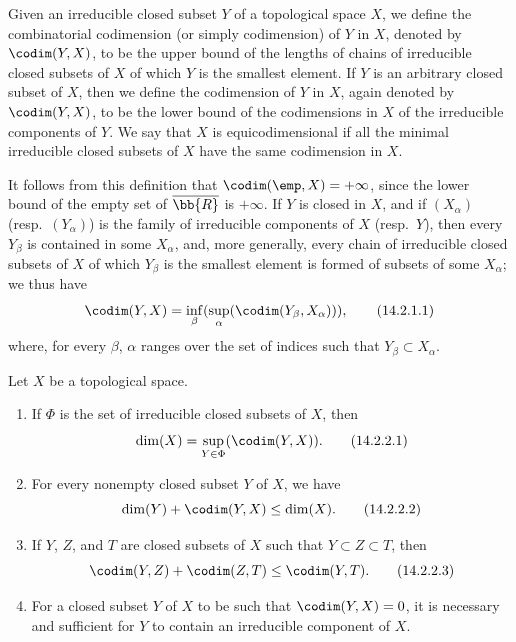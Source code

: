 \begin{definition}[14.2.1]
\label{0.14.2.1}
Given an irreducible closed subset $Y$ of a topological space $X$, we define the combinatorial codimension (or simply codimension) of $Y$ in $X$, denoted by $\codim(Y,X)$, to be the upper bound of the lengths of chains of irreducible closed subsets of $X$ of which $Y$ is the smallest element.
If $Y$ is an arbitrary closed subset of $X$, then we define the codimension of $Y$ in $X$, again denoted by $\codim(Y,X)$, to be the lower bound of the codimensions in $X$ of the irreducible components of $Y$.
We say that $X$ is equicodimensional if all the minimal irreducible closed subsets of $X$ have the same codimension in $X$.
\end{definition}

It follows from this definition that $\codim(\emp,X)=+\infty$, since the lower bound of the empty set of $\overline{\bb{R}}$ is $+\infty$.
If $Y$ is closed in $X$, and if $(X_\alpha)$ (resp.~$(Y_\alpha)$) is the family of irreducible components of $X$ (resp.~$Y$), then every $Y_\beta$ is contained in some $X_\alpha$, and, more generally, every chain of irreducible closed subsets of $X$ of which $Y_\beta$ is the smallest element is formed of subsets of some $X_\alpha$; we thus have
\[
\label{0.14.2.1.1}
  \codim(Y,X)=\inf_\beta(\sup_\alpha(\codim(Y_\beta,X_\alpha))),
  \tag{14.2.1.1}
\]
where, for every $\beta$, $\alpha$ ranges over the set of indices such that $Y_\beta\subset X_\alpha$.

\begin{proposition}[14.2.2]
\label{0.14.2.2}
Let $X$ be a topological space.
\begin{enumerate}
  \item[{\rm(i)}] If $\Phi$ is the set of irreducible closed subsets of $X$, then
    \[
    \label{0.14.2.2.1}
      \dim(X)=\sup_{Y\in\Phi}(\codim(Y,X)).
      \tag{14.2.2.1}
    \]
  \item[{\rm(ii)}] For every nonempty closed subset $Y$ of $X$, we have
    \[
    \label{0.14.2.2.2}
      \dim(Y)+\codim(Y,X)\leq\dim(X).
      \tag{14.2.2.2}
    \]
  \item[{\rm(iii)}] If $Y$, $Z$, and $T$ are closed subsets of $X$ such that $Y\subset Z\subset T$, then
    \[
    \label{0.14.2.2.3}
      \codim(Y,Z)+\codim(Z,T)\leq\codim(Y,T).
       \tag{14.2.2.3}
    \]
  \item[{\rm(iv)}] For a closed subset $Y$ of $X$ to be such that $\codim(Y,X)=0$, it is necessary and sufficient for $Y$ to contain an irreducible component of $X$.
\end{enumerate}
\end{proposition}

